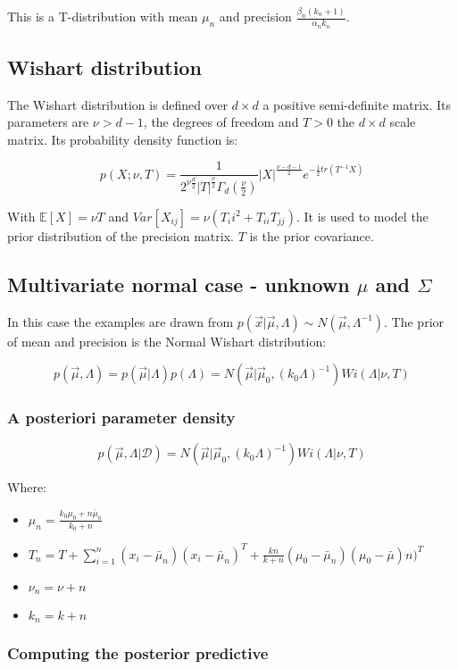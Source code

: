		This is a T-distribution with mean $\mu_n$ and precision $\frac{\beta_n(k_n+1)}{\alpha_n k_n}$.

	\subsection{Wishart distribution}
	The Wishart distribution is defined over $d\times d$ a positive semi-definite matrix.
	Its parameters are $\nu>d-1$, the degrees of freedom and $T>0$ the $d\times d$ scale matrix.
	Its probability density function is:

	$$p(X;\nu, T) = \frac{1}{2^{\nu\frac{d}{2}}|T|^{\frac{\nu}{2}}\Gamma_d(\frac{\nu}{2})}|X|^{\frac{\nu-d-1}{2}}e^{-\frac{1}{2}tr(T^{-1}X)}$$

	With $\mathbb{E}[X] = \nu T$ and $Var[X_{ij}] = \nu(T_ii^2+T_{ii}T_{jj})$.
	It is used to model the prior distribution of the precision matrix.
	$T$ is the prior covariance.

	\subsection{Multivariate normal case - unknown $\mu$ and $\Sigma$}
	In this case the examples are drawn from $p(\vec{x}|\vec{\mu}, \Lambda)\sim N(\vec{\mu}, \Lambda^{-1})$.
	The prior of mean and precision is the Normal Wishart distribution:

	$$p(\vec{\mu}, \Lambda) = p(\vec{\mu}|\Lambda)p(\Lambda) = N(\vec{\mu}|\vec{\mu}_0, (k_0\Lambda)^{-1})Wi(\Lambda|\nu, T)$$

		\subsubsection{A posteriori parameter density}

		$$p(\vec{\mu}, \Lambda|\mathcal{D}) = N(\vec{\mu}|\vec{\mu}_0, (k_0\Lambda)^{-1})Wi(\Lambda|\nu, T)$$

		Where:

		\begin{itemize}
			\item $\mu_n = \frac{k_0\mu_0+n\bar{\mu}_n}{k_0+n}$
			\item $T_n = T+\sum\limits_{i=1}^n(x_i-\bar{\mu}_n)(x_i-\bar{\mu}_n)^T + \frac{kn}{k+n}(\mu_0-\bar{\mu}_n)(\mu_0-\bar{\mu})n)^T$
			\item $\nu_n = \nu+n$
			\item $k_n = k+n$
		\end{itemize}

		\subsubsection{Computing the posterior predictive}

